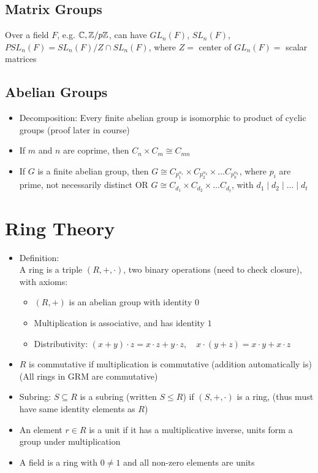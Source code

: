 \subsection*{Matrix Groups}
Over a field $F$, e.g. $\mathbb{C}, \mathbb{Z}/p\mathbb{Z}$, can have $GL_n(F)$, $SL_n(F)$, $PSL_n(F) = SL_n(F)/Z \cap SL_n(F)$, where $Z =$ center of $GL_n(F) = $ scalar matrices

\subsection*{Abelian Groups}
\begin{itemize}
      \item Decomposition: Every finite abelian group is isomorphic to product of cyclic groups (proof later in course)
      \item If $m$ and $n$ are coprime, then $C_n \times C_m \cong C_{mn}$
      \item If $G$ is a finite abelian group, then $G \cong C_{p_1^{\alpha_1}} \times C_{p_2^{\alpha_2}} \times \dots C_{p_k^{\alpha_k}}$, where $p_i$ are prime, not necessarily distinct
            OR $G \cong C_{d_1} \times C_{d_2} \times \dots C_{d_t}$, with $d_1 \mid d_2 \mid \dots \mid d_t$
\end{itemize}


\section{Ring Theory}
\begin{itemize}
      \item Definition:\\
            A ring is a triple $(R,+,\cdot)$, two binary operations (need to check closure), with axioms:
            \begin{itemize}
                  \item $(R,+)$ is an abelian group with identity $0$
                  \item Multiplication is associative, and has identity $1$
                  \item Distributivity: $(x+y)\cdot z = x\cdot z + y \cdot z, \quad x \cdot(y+z) = x \cdot y + x \cdot z$
            \end{itemize}
      \item $R$ is commutative if multiplication is commutative (addition automatically is)\\ (All rings in GRM are commutative)
      \item Subring: $S \subseteq R$ is a subring (written $S \leq R$) if $(S, +, \cdot)$ is a ring, (thus must have same identity elements as $R$)
      \item An element $r\in R$ is a unit if it has a multiplicative inverse, units form a group under multiplication
      \item A field is a ring with $0\neq 1$ and all non-zero elements are units
\end{itemize}

